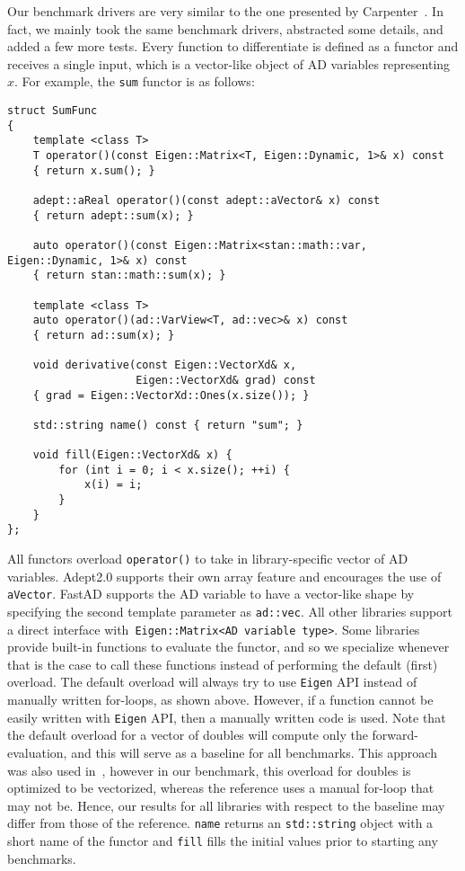Our benchmark drivers are very similar to the one presented by Carpenter~\cite{carpenter:2015}.
In fact, we mainly took the same benchmark drivers, abstracted some details, and added a few more tests.
Every function to differentiate is defined as a functor and receives a single input,
which is a vector-like object of AD variables representing $x$.
For example, the \verb|sum| functor is as follows:
\begin{lstlisting}[style=customcpp]
struct SumFunc
{
    template <class T>
    T operator()(const Eigen::Matrix<T, Eigen::Dynamic, 1>& x) const
    { return x.sum(); }

    adept::aReal operator()(const adept::aVector& x) const
    { return adept::sum(x); }

    auto operator()(const Eigen::Matrix<stan::math::var, Eigen::Dynamic, 1>& x) const
    { return stan::math::sum(x); }

    template <class T>
    auto operator()(ad::VarView<T, ad::vec>& x) const
    { return ad::sum(x); }

    void derivative(const Eigen::VectorXd& x,
                    Eigen::VectorXd& grad) const
    { grad = Eigen::VectorXd::Ones(x.size()); }

    std::string name() const { return "sum"; }

    void fill(Eigen::VectorXd& x) {
        for (int i = 0; i < x.size(); ++i) {
            x(i) = i;
        }
    }
};
\end{lstlisting}
All functors overload \verb|operator()| to take in library-specific vector of AD variables.
Adept2.0 supports their own array feature and encourages the use of \verb|aVector|.
FastAD supports the AD variable to have a vector-like shape by specifying the second template parameter as \verb|ad::vec|.
All other libraries support a direct interface with~\verb|Eigen::Matrix<AD variable type>|.
Some libraries provide built-in functions to evaluate the functor, and so we specialize whenever that is the case
to call these functions instead of performing the default (first) overload.
The default overload will always try to use \verb|Eigen| API instead of manually written for-loops, as shown above.
However, if a function cannot be easily written with \verb|Eigen| API, then a manually written code is used.
Note that the default overload for a vector of doubles will compute only the forward-evaluation,
and this will serve as a baseline for all benchmarks.
This approach was also used in~\cite{carpenter:2015},
however in our benchmark, this overload for doubles is optimized to be vectorized,
whereas the reference uses a manual for-loop that may not be.
Hence, our results for all libraries with respect to the baseline may differ from those of the reference.
\verb|name| returns an \verb|std::string| object with a short name of the functor
and \verb|fill| fills the initial values prior to starting any benchmarks. 

